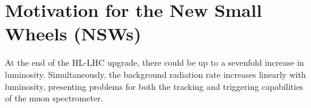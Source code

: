 



\section{Motivation for the New Small Wheels (NSWs)}

At the end of the HL-LHC upgrade, there could be up to a sevenfold increase in luminosity. Simultaneously, the background radiation rate increases linearly with luminosity, presenting problems for both the tracking and triggering capabilities of the muon spectrometer.


